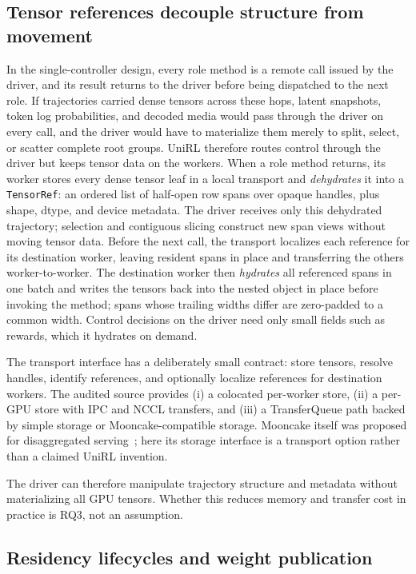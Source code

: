 \documentclass[10pt]{article}
\begin{document}
\subsection{Tensor references decouple structure from movement}

In the single-controller design, every role method is a remote call issued by the driver, and its result returns to the driver before being dispatched to the next role.
If trajectories carried dense tensors across these hops, latent snapshots, token log probabilities, and decoded media would pass through the driver on every call, and the driver would have to materialize them merely to split, select, or scatter complete root groups.
UniRL therefore routes control through the driver but keeps tensor data on the workers.
When a role method returns, its worker stores every dense tensor leaf in a local transport and \emph{dehydrates} it into a \texttt{TensorRef}: an ordered list of half-open row spans over opaque handles, plus shape, dtype, and device metadata.
The driver receives only this dehydrated trajectory; selection and contiguous slicing construct new span views without moving tensor data.
Before the next call, the transport localizes each reference for its destination worker, leaving resident spans in place and transferring the others worker-to-worker.
The destination worker then \emph{hydrates} all referenced spans in one batch and writes the tensors back into the nested object in place before invoking the method; spans whose trailing widths differ are zero-padded to a common width.
Control decisions on the driver need only small fields such as rewards, which it hydrates on demand.

The transport interface has a deliberately small contract: store tensors, resolve handles, identify references, and optionally localize references for destination workers.
The audited source provides (i) a colocated per-worker store, (ii) a per-GPU store with IPC and NCCL transfers, and (iii) a TransferQueue path backed by simple storage or Mooncake-compatible storage.
Mooncake itself was proposed for disaggregated serving~\citep{qin2024mooncake}; here its storage interface is a transport option rather than a claimed UniRL invention.

The driver can therefore manipulate trajectory structure and metadata without materializing all GPU tensors.
Whether this reduces memory and transfer cost in practice is RQ3, not an assumption.

\subsection{Residency lifecycles and weight publication}
\label{sec:lifecycle}
\end{document}
